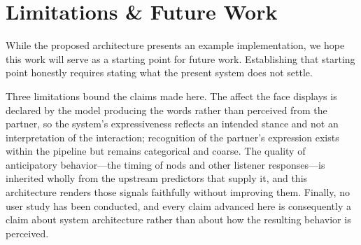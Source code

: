 \section{Limitations \& Future Work}

%

While the proposed architecture presents an example implementation, we hope this work will serve as a starting point for future work. Establishing that
starting point honestly requires stating what the present system does not
settle.

Three limitations bound the claims made here. The affect the face displays is
declared by the model producing the words rather than perceived from the
partner, so the system's expressiveness reflects an intended stance and not an
interpretation of the interaction; recognition of the partner's expression
exists within the pipeline but remains categorical and coarse. The quality of
anticipatory behavior---the timing of nods and other listener responses---is
inherited wholly from the upstream predictors that supply it, and this
architecture renders those signals faithfully without improving them. Finally,
no user study has been conducted, and every claim advanced here is
consequently a claim about system architecture rather than about how the
resulting behavior is perceived.

